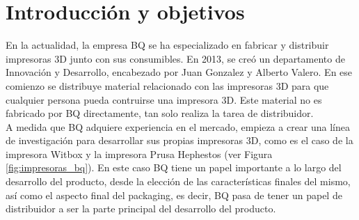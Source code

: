\chapter{Introducción y objetivos}
\label{cap:introduccion}

En la actualidad, la empresa BQ se ha especializado en fabricar y distribuir impresoras 3D junto con sus consumibles. En 2013, se creó un departamento de Innovación y Desarrollo, encabezado por Juan Gonzalez y Alberto Valero. En ese comienzo se distribuye material relacionado con las impresoras 3D para que cualquier persona pueda contruirse una impresora 3D. Este material no es fabricado por BQ directamente, tan solo realiza la tarea de distribuidor.\\

A medida que BQ adquiere experiencia en el mercado, empieza a crear una línea de investigación para desarrollar sus propias impresoras 3D, como es el caso de la impresora Witbox y la impresora Prusa Hephestos (ver Figura \ref{fig:impresoras_bq}). En este caso BQ tiene un papel importante a lo largo del desarrollo del producto, desde la elección de las características finales del mismo, así como el aspecto final del packaging, es decir, BQ pasa de tener un papel de distribuidor a ser la parte principal del desarrollo del producto.\\

